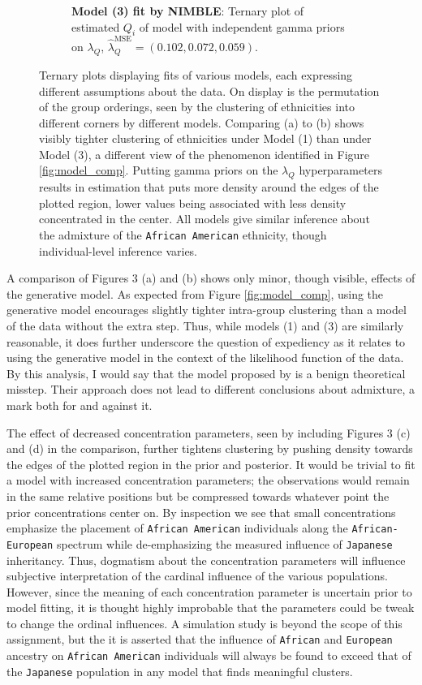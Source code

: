 \documentclass{article}
\begin{document}
\begin{figure}[h]
\begin{subfigure}[t]{.4\textwidth}
    \caption{\textbf{Model (3) fit by NIMBLE}: Ternary plot of estimated $Q_i$ of model with independent gamma priors on $\lambda_Q$, $\hat{\lambda}^{\text{MSE}}_Q = (0.102, 0.072, 0.059)$.}
  \end{subfigure}
  \caption{Ternary plots displaying fits of various models, each expressing different assumptions about the data. On display is the permutation of the group orderings, seen by the clustering of ethnicities into different corners by different models. Comparing (a) to (b) shows visibly tighter clustering of ethnicities under Model (1) than under Model (3), a different view of the phenomenon identified in Figure \ref{fig:model_comp}. Putting gamma priors on the $\lambda_Q$ hyperparameters results in estimation that puts more density around the edges of the plotted region, lower values being associated with less density concentrated in the center. All models give similar inference about the admixture of the \texttt{African American} ethnicity, though individual-level inference varies.}
  \label{fig:results}
\end{figure}

A comparison of Figures 3 (a) and (b) shows only minor, though visible, effects of the generative model. As expected from Figure \ref{fig:model_comp}, using the generative model encourages slightly tighter intra-group clustering than a model of the data without the extra step. Thus, while models (1) and (3) are similarly reasonable, it does further underscore the question of expediency as it relates to using the generative model in the context of the likelihood function of the data. By this analysis, I would say that the model proposed by \citeauthor{efron2016CASI} is a benign theoretical misstep. Their approach does not lead to different conclusions about admixture, a mark both for and against it.

The effect of decreased concentration parameters, seen by including Figures 3 (c) and (d) in the comparison, further tightens clustering by pushing density towards the edges of the plotted region in the prior and posterior. It would be trivial to fit a model with increased concentration parameters; the observations would remain in the same relative positions but be compressed towards whatever point the prior concentrations center on. By inspection we see that small concentrations emphasize the placement of \texttt{African American} individuals along the \texttt{African-European} spectrum while de-emphasizing the measured influence of \texttt{Japanese} inheritancy. Thus, dogmatism about the concentration parameters will influence subjective interpretation of the cardinal influence of the various populations. However, since the meaning of each concentration parameter is uncertain prior to model fitting, it is thought highly improbable that the parameters could be tweak to change the ordinal influences. A simulation study is beyond the scope of this assignment, but the it is asserted that the influence of \texttt{African} and \texttt{European} ancestry on \texttt{African American} individuals will always be found to exceed that of the \texttt{Japanese} population in any model that finds meaningful clusters.
\end{document}
